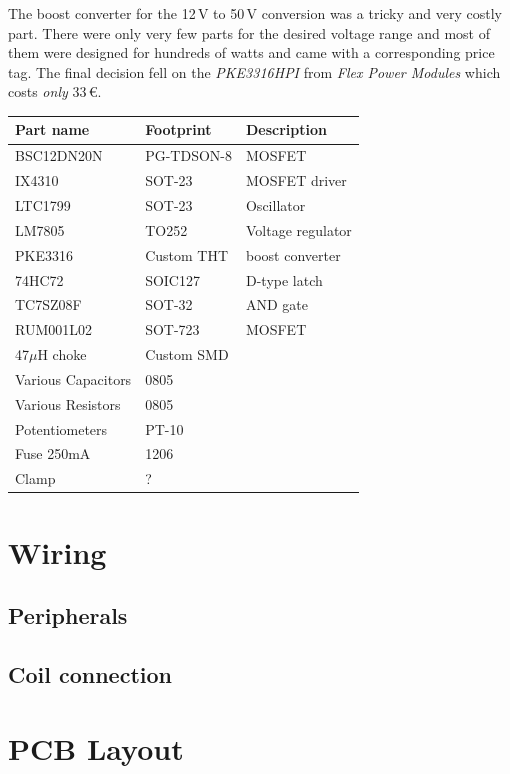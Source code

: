 The boost converter for the 12\,V to 50\,V conversion was a tricky and very costly part. There were only very few parts for the desired voltage range and most of them were designed for hundreds of watts and came with a corresponding price tag. The final decision fell on the \emph{PKE3316HPI} from \emph{Flex Power Modules} which costs \emph{only} 33\,€.


\begin{tabular}{@{}lll@{}}
    \toprule
    \textbf{Part name} & \textbf{Footprint} & \textbf{Description}\\\midrule
    BSC12DN20N & PG-TDSON-8 & MOSFET\\
    IX4310 & SOT-23 & MOSFET driver\\
    LTC1799 & SOT-23 & Oscillator\\
    LM7805 & TO252 & Voltage regulator\\
    PKE3316 & Custom THT & boost converter\\
    74HC72 & SOIC127 & D-type latch\\
    TC7SZ08F & SOT-32 & AND gate\\
    RUM001L02 & SOT-723 & MOSFET\\
    47\(\mu\)H choke & Custom SMD &\\
    Various Capacitors & 0805 &\\
    Various Resistors & 0805 &\\
    Potentiometers & PT-10&\\
    Fuse 250mA & 1206 &\\
    Clamp & ? &\\
    \bottomrule
\end{tabular}

\section{Wiring}

\subsection{Peripherals}

\subsection{Coil connection}

\section{PCB Layout}

